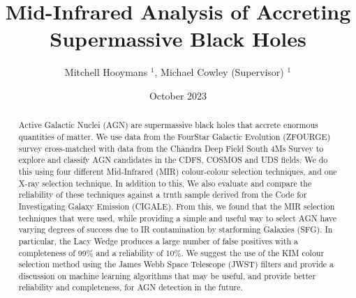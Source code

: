 \documentclass[11pt]{iopart}
\date{October 2023}
\begin{document}
\title{Mid-Infrared Analysis of Accreting Supermassive Black Holes}
\author{Mitchell Hooymans $^1$, Michael Cowley (Supervisor) $^1$}
\address{$^1$ Queensland University of Technology, Brisbane, Australia, 4000}

\begin{abstract}
Active Galactic Nuclei (AGN) are supermassive black holes that accrete enormous quantities of matter. We use data from the FourStar Galactic Evolution (ZFOURGE) survey cross-matched with data from the Chandra Deep Field South 4Ms Survey to explore and classify AGN candidates in the CDFS, COSMOS and UDS fields. We do this using four different Mid-Infrared (MIR) colour-colour selection techniques, and one X-ray selection technique. In addition to this, We also evaluate and compare the reliability of these techniques against a truth sample derived from the Code for Investigating Galaxy Emission (CIGALE). From this, we found that the MIR selection techniques that were used, while providing a simple and useful way to select AGN have varying degrees of success due to IR contamination by starforming Galaxies (SFG). In particular, the Lacy Wedge produces a large number of false positives with a completeness of 99\% and a reliability of 10\%. We suggest the use of the KIM colour selection method using the James Webb Space Telescope (JWST) filters and provide a discussion on machine learning algorithms that may be useful, and provide better reliability and completeness, for AGN detection in the future. 
\end{abstract}

\ioptwocol
\end{document}
